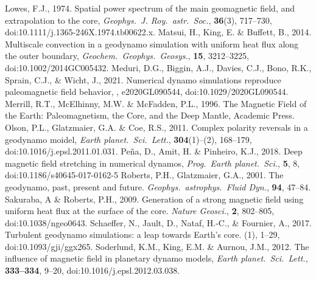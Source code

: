 \begin{thebibliography}{}
%
Lowes, F.J., 1974. Spatial power spectrum of the main geomagnetic field, and extrapolation to the core, {\it Geophys.\ J. Roy.\ astr.\ Soc.}, {\bf 36}(3), 717--730, doi:10.1111/j.1365-246X.1974.tb00622.x.
%
Matsui, H., King, E. \& Buffett, B., 2014. Multiscale convection in a geodynamo simulation with uniform heat flux along the outer boundary, {\it Geochem.\ Geophys.\ Geosys.}, {\bf 15},  3212--3225, doi:10.1002/2014GC005432.
%
Meduri, D.G., Biggin, A.J., Davies, C.J., Bono, R.K., Sprain, C.J., \& Wicht, J., 2021. Numerical dynamo simulations reproduce paleomagnetic field behavior, , e2020GL090544, doi:10.1029/2020GL090544.
%
Merrill, R.T., McElhinny, M.W. \& McFadden, P.L., 1996. The Magnetic Field of the Earth: Paleomagnetism, the Core, and the Deep Mantle, Academic Press.
%
Olson, P.L., Glatzmaier, G.A. \& Coe, R.S., 2011. Complex polarity reversals in a geodynamo moidel, {\it Earth planet.\ Sci.\ Lett.}, {\bf 304}(1)--(2), 168--179, doi:10.1016/j.epsl.2011.01.031.
%
Pe{\~n}a, D., Amit, H. \& Pinheiro, K.J., 2018. Deep magnetic field stretching in numerical dynamos, {\it Prog.\ Earth planet.\ Sci.}, {\bf 5}, 8, doi:10.1186/s40645-017-0162-5
%
Roberts, P.H.,  Glatzmaier, G.A., 2001. The geodynamo, past, present and future. {\it Geophys.\ astrophys.\ Fluid Dyn.}, {\bf 94}, 47--84.
%
Sakuraba, A \& Roberts, P.H., 2009. Generation of a strong magnetic field using uniform heat flux at the surface of the core. {\it Nature Geosci.}, {\bf 2}, 802--805, doi:10.1038/ngeo0643.
%
Schaeffer, N., Jault, D., Nataf, H.-C., \& Fournier, A., 2017. Turbulent geodynamo simulations: a leap towards Earth's core. (1), 1--29, doi:10.1093/gji/ggx265.
%
Soderlund, K.M., King, E.M. \& Aurnou, J.M., 2012. The influence of magnetic field in planetary dynamo models, {\it Earth planet.\ Sci.\ Lett.}, {\bf 333--334}, 9--20, doi:10.1016/j.epsl.2012.03.038.

\end{thebibliography}

